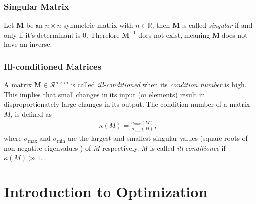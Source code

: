 \subsubsection{Singular Matrix }

Let $ \mathbf{M}$  be an $n \times n$ symmetric matrix with  $n \in \mathbb{R}$, then $ \mathbf{M}$ is called \emph{singular} if and only if it's determinant is $0$. Therefore $\mathbf{M}^{-1}$ does not exist, meaning $ \mathbf{M}$ does not have an inverse.\\ 
\subsubsection{Ill-conditioned Matrices}
A matrix $\mathbf{M} \in \mathcal{R}^{n\times m}$ is called \emph{ill-conditioned} when its \emph{condition number} is high.
This implies that small changes in its input (or elements) result in disproportionately large changes in its output.
The condition number of a matrix $M$, is defined as 
\begin{align}
    \kappa(M) = \frac{\sigma_{\max}(M)}{\sigma_{\min}(M)},
    \end{align}
where $\sigma_{\max}$ and $\sigma_{\min}$ are the largest and smallest singular values (square roots of non-negative eigenvalues \cite{SZABO2015320}) of $M$ respectively.
$M$ is called \emph{ill-conditioned} if $\kappa(M) \gg 1$.
\cite{strang2022introduction}.
\section{Introduction to Optimization}
\label{sec:optimization}

